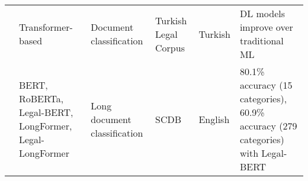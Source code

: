 \documentclass[runningheads]{llncs}
\begin{document}
\begin{table}[ht]
\begin{tabularx}{\textwidth}{p{}XXXXp{}}
\cite{Akca2022} & Transformer-based & Document classification &
                                                                Turkish
                                                                Legal
                                                                Corpus
                                                                                        &
                                                                                          Turkish
                                                                                                            &
                                                                                                              DL
                                                                                                              models
                                                                                                              improve
                                                                                                              over
                                                                                                              traditional
  ML\\

  \cite{Vatsal2023} & BERT, RoBERTa,
                      Legal-BERT,
                      LongFormer,
                      Legal-LongFormer & Long document classification & SCDB & English & 80.1\%
                                                                                         accuracy
                                                                                         (15
                                                                                         categories),
                                                                                         60.9\%
                                                                                         accuracy
                                                                                         (279
                                                                                         categories)
                                                                                         with
                                                                                         Legal-BERT \\
  \hline
\end{tabularx}
\end{table}
\end{document}
